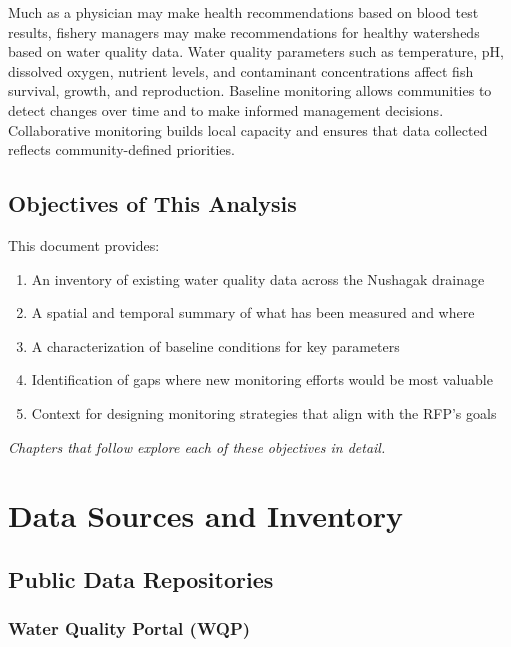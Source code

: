 \documentclass[
  letterpaper,
]{scrbook}
\providecommand{\tightlist}{%
  \setlength{\itemsep}{0pt}\setlength{\parskip}{0pt}}\usepackage{longtable,booktabs,array}
\begin{document}
Much as a physician may make health recommendations based on blood test
results, fishery managers may make recommendations for healthy
watersheds based on water quality data. Water quality parameters such as
temperature, pH, dissolved oxygen, nutrient levels, and contaminant
concentrations affect fish survival, growth, and reproduction. Baseline
monitoring allows communities to detect changes over time and to make
informed management decisions. Collaborative monitoring builds local
capacity and ensures that data collected reflects community-defined
priorities.

\section{Objectives of This Analysis}\label{objectives-of-this-analysis}

This document provides:

\begin{enumerate}
\def\labelenumi{\arabic{enumi}.}
\tightlist
\item
  An inventory of existing water quality data across the Nushagak
  drainage
\item
  A spatial and temporal summary of what has been measured and where
\item
  A characterization of baseline conditions for key parameters
\item
  Identification of gaps where new monitoring efforts would be most
  valuable
\item
  Context for designing monitoring strategies that align with the RFP's
  goals
\end{enumerate}

\emph{Chapters that follow explore each of these objectives in detail.}

\chapter{Data Sources and Inventory}\label{data-sources-and-inventory}

\section{Public Data Repositories}\label{public-data-repositories}

\subsection{Water Quality Portal (WQP)}\label{water-quality-portal-wqp}
\end{document}
